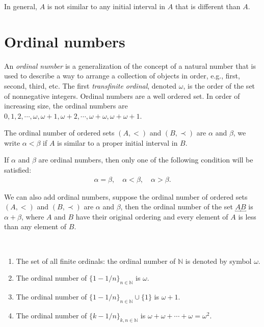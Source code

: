 \begin{remark}
In general, $A$ is not similar to any initial interval in $A$ that is different than $A$.
\end{remark}

\medskip


\section{Ordinal numbers}

An {\em ordinal number} is a generalization of the concept of a natural number that is used to describe a way to arrange a collection of objects in order, e.g., first, second, third, etc. The first {\em transfinite ordinal}, denoted $\omega$, is the order of the set of nonnegative integers. Ordinal numbers are a well ordered set. In order of increasing size, the ordinal numbers are $0, 1, 2, \cdots, \omega, \omega + 1, \omega + 2, \cdots, \omega + \omega, \omega + \omega + 1$.
\medskip

\begin{definition}
The ordinal number of ordered sets $(A, <)$ and $(B, \prec)$ are $\alpha$ and $\beta$, we write $\alpha < \beta$ if $A$ is similar to a proper initial interval in $B$.
\end{definition}

\medskip

\begin{theorem}
If $\alpha$ and $\beta$ are ordinal numbers, then only one of the following condition will be satisfied:
\begin{align*}
    \alpha = \beta, \quad \alpha < \beta, \quad \alpha > \beta.
\end{align*}
\end{theorem}

\medskip

We can also add ordinal numbers, suppose the ordinal number of ordered sets $(A, <)$ and $(B, \prec)$ are $\alpha$ and $\beta$, then the ordinal number of the set $\underbracket{A} \underbracket{B}$ is $\alpha + \beta$, where $A$ and $B$ have their original ordering and every element of $A$ is less than any element of $B$.

\medskip

\begin{example}
~\begin{enumerate}[label=(\alph*)]
    \item The set of all finite ordinals: the ordinal number of $\mathbb{N}$ is denoted by symbol $\omega$.
    
    \item The ordinal number of $\{1 - 1/n\}_{n \in \mathbb{N}}$ is $\omega$.
    
    \item The ordinal number of $\{1 - 1/n\}_{n \in \mathbb{N}} \cup \{1\}$ is $\omega + 1$.
    
    \item The ordinal number of $\{k - 1/n\}_{k,n \in \mathbb{N}}$ is $\omega + \omega + \cdots + \omega = \omega^2$.
\end{enumerate}
\end{example}
\medskip

